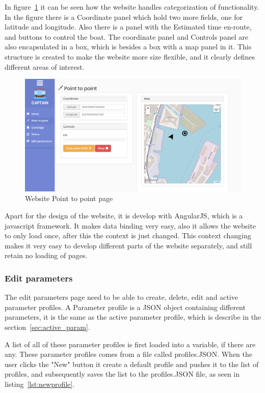 In figure~\ref{fig:p2ppage} it can be seen how the website handles categorization of functionality. In the figure there is a Coordinate panel which hold two more fields, one for latitude and longitude. Also there is a panel with the Estimated time en-route, and buttons to control the boat. The coordinate panel and Controls panel are also encapsulated in a box, which is besides a box with a map panel in it. This structure is created to make the website more size flexible, and it clearly defines different areas of interest.

\begin{figure}[H]
\centering
\includegraphics[width=0.9\linewidth]{Images/Implementation/p2p_page}
\caption{Website Point to point page}
\label{fig:p2ppage}
\end{figure}

Apart for the design of the website, it is develop with AngularJS\cite{angular}, which is a javascript framework. It makes data binding very easy, also it allows the website to only load once, after this the context is just changed. This context changing makes it very easy to develop different parts of the website separately, and still retain no loading of pages.

\subsubsection{Edit parameters}
The edit parameters page need to be able to create, delete, edit and active parameter profiles. A Parameter profile is a JSON object containing different parameters, it is the same as the active parameter profile, which is describe in the section~\ref{sec:active_param}.

A list of all of these parameter profiles is first loaded into a variable, if there are any. These parameter profiles comes from a file called profiles.JSON. When the user clicks the "New" button it create a default profile and pushes it to the list of profiles, and subsequently saves the list to the profiles.JSON file, as seen in listing~\ref{lst:newprofile}. 

